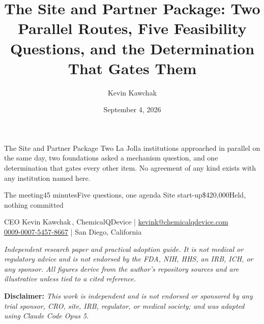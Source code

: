 \documentclass[11pt]{article}
\title{The Site and Partner Package: Two Parallel Routes, Five Feasibility
Questions, and the Determination That Gates Them}
\author{Kevin Kawchak}
\date{September 4, 2026}
\begin{document}
\thispagestyle{plain}

%
{The Site and Partner Package}%
{Two La Jolla institutions approached in parallel on the same day, two
foundations asked a mechanism question, and one determination that gates every
other item. No agreement of any kind exists with any institution named here.}

\vspace{0.15em}

\begin{center}
 \enspace {} \enspace
{} \enspace {} \enspace
{}
\end{center}

\vspace{-0.15em}

%
{The meeting}{45 minutes}{Five questions, one agenda}%
{Site start-up}{\$420,000}{Held, nothing committed}

\vspace{-0.1em}
\apprule{0.9pt}

\begin{center}\small
CEO Kevin Kawchak\,, ChemicalQDevice \;|\;
\href{mailto:kevink@chemicalqdevice.com}{kevink@chemicalqdevice.com}\\
\href{https://orcid.org/0009-0007-5457-8667}{0009-0007-5457-8667} \;|\;
San Diego, California
\end{center}

\vspace{-0.25em}
\apprule{0.5pt}

\noindent\footnotesize\textit{Independent research paper and practical adoption
guide. It is not medical or regulatory advice and is not endorsed by the FDA,
NIH, HHS, an IRB, ICH, or any sponsor. All figures derive from the author's
repository sources and are illustrative unless tied to a cited
reference.}\normalsize\par

\vspace{0.12em}

\noindent\footnotesize\textbf{Disclaimer:} \textit{This work is independent and
is not endorsed or sponsored by any trial sponsor, CRO, site, IRB, regulator, or
medical society; and was adapted using Claude Code Opus 5.}\normalsize\par
\end{document}
